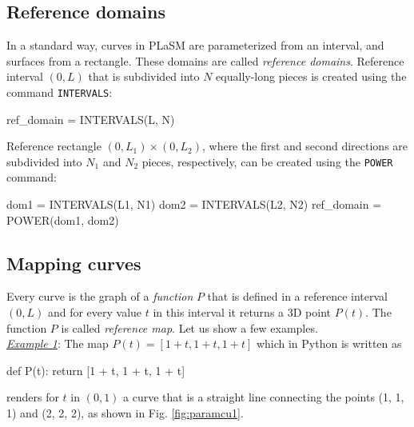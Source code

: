 \subsection{Reference domains}

In a standard way, curves in PLaSM are parameterized from an interval,
and surfaces from a rectangle. These domains are called
{\em reference domains}. 
Reference interval $(0, L)$ that is subdivided into $N$ equally-long pieces is 
created using the command {\tt INTERVALS}:

\begin{bluecode}
ref_domain = INTERVALS(L, N)
\end{bluecode}
Reference rectangle $(0, L_1) \times (0, L_2)$, where the first and second 
directions are subdivided into $N_1$ and $N_2$ pieces, respectively, can be 
created using the {\tt POWER} command:

\begin{bluecode}
dom1 = INTERVALS(L1, N1)
dom2 = INTERVALS(L2, N2)
ref_domain = POWER(dom1, dom2)
\end{bluecode}

\subsection{Mapping curves}

Every curve is the graph of a {\em function} $P$ that is defined 
in a reference interval $(0, L)$ and for every value $t$ in this 
interval it returns a 3D point $P(t)$. The function 
$P$ is called {\em reference map}. Let us show a few examples.\\

\noindent
\underline{\em Example 1}: The map
$
P(t) = [1+t, 1+t, 1+t]
$
which in Python is written as

\begin{bluecode}
def P(t): return [1 + t, 1 + t, 1 + t]
\end{bluecode}
renders for $t$ in $(0, 1)$ a curve that is a straight line connecting the 
points (1, 1, 1) and (2, 2, 2), as shown in Fig. \ref{fig:paramcu1}.

